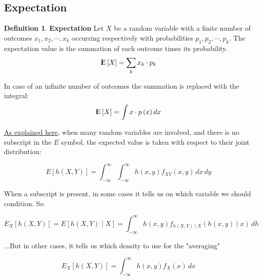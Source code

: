 \documentclass[12pt, letterpaper]{article}
\theoremstyle{definition}
\newtheorem{definition}{Definition}[section]
\newcommand{\E}{{\rm I\kern-.3em E}}
\begin{document}
\subsection{Expectation}
\begin{definition}{\textbf{Expectation}}
Let $X$ be a random variable with a finite number of outcomes $x_1, x_2, \cdots, x_k$ occurring respectively with probabilities $p_1, p_2, \cdots, p_k$. The expectation value is the summation of each outcome times its probability.
\begin{equation}
\E\left[ X\right]= \sum_k x_k \cdot p_k
\end{equation}

In case of an infinite number of outcomes the summation is replaced with the integral:
\begin{equation}
\E\left[ X\right]= \int x \cdot p\left(x \right) dx
\end{equation}
\end{definition}

\href{https://stats.stackexchange.com/a/72614/238980}{As explained here}, when many random variables are involved, and there is no subscript in the $E$ symbol, the expected value is taken with respect to their joint distribution:

$$E[h(X,Y)] = \int_{-\infty}^\infty \int_{-\infty}^\infty h(x,y) f_{XY}(x,y) \, dx \, dy$$


When a subscript is present, in some cases it tells us on which variable we should condition. So

$$E_X[h(X,Y)] = E[h(X,Y)\mid X] = \int_{-\infty}^\infty h(x,y) f_{h(X,Y)\mid X}(h(x,y)\mid x)\,dh  $$

...But in other cases, it tells us which density to use for the "averaging"

$$E_X[h(X,Y)] = \int_{-\infty}^\infty h(x,y) f_{X}(x) \, dx $$
\end{document}
